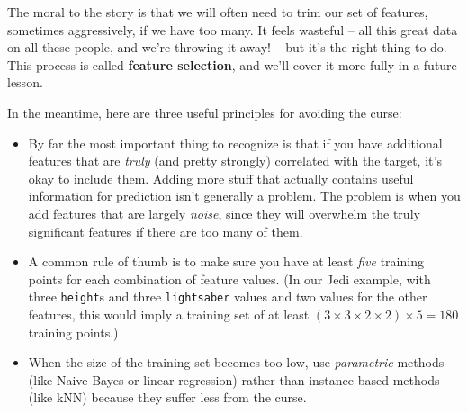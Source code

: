 The moral to the story is that we will often need to trim our set of features,
sometimes aggressively, if we have too many. It feels wasteful -- all this
great data on all these people, and we're throwing it away! -- but it's the
right thing to do. This process is called \textbf{feature selection}, and
we'll cover it more fully in a future lesson.

\vspace{.1in}
In the meantime, here are three useful principles for avoiding the curse:

\begin{itemize}
\itemsep.1em
\item By far the most important thing to recognize is that if you have
additional features that are \textit{truly} (and pretty strongly) correlated
with the target, it's okay to include them. Adding more stuff that actually
contains useful information for prediction isn't generally a problem. The
problem is when you add features that are largely \textit{noise}, since
they will overwhelm the truly significant features if there are too many of
them.
\item A common rule of thumb is to make sure you have at least \textit{five}
training points for each combination of feature values. (In our Jedi example,
with three \texttt{height}s and three \texttt{lightsaber} values and two
values for the other features, this would imply a training set of at least $(3
\times 3 \times 2 \times 2) \times 5 = 180$ training points.)
\item When the size of the training set becomes too low, use
\textit{parametric} methods (like Naive Bayes or linear regression) rather
than instance-based methods (like kNN) because they suffer less from the
curse.
\end{itemize}


